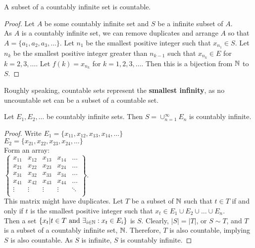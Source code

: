 \begin{theorem}
	A subset of a countably infinite set is countable.
	\begin{proof}
		Let $A$ be some countably infinite set and $S$ be a infinite subset of $A$.\\
		As $A$ is a countably infinite set, we can remove duplicates and arrange
		$A$ so that $A=\{a_1,a_2,a_3,\ldots\}$.
		Let $n_1$ be the smallest positive integer such that $x_{n_1} \in S$.
		Let $n_k$ be the smallest positive integer greater than $n_{k-1}$ such that $x_{n_{k}} \in E$ for $k=2,3,\ldots$. Let $f(k)=x_{n_k}$ for $k=1,2,3,\ldots$. Then this is a bijection from $\mathbb{N} $ to $S$.
	\end{proof}
	\begin{remark}
		Roughly speaking, countable sets represent the \textbf{smallest infinity}, as no uncountable set can be a subset of a countable set.
	\end{remark}


\end{theorem}
\begin{theorem}
	\label{thm:countableunion}
	Let $E_1, E_2, \ldots$ be countably infinite sets.
	Then $S=\cup_{n=1}^{\infty} E_n$ is countably infinite.
	\begin{proof}
		Write
		$E_1=\{x_{11},x_{12},x_{13},x_{14},\ldots\} $\\
		$E_2=\{x_{21},x_{22},x_{23},x_{24},\ldots\}$\\
		Form an array: \\
		$
			\begin{Bmatrix}
				x_{11} & x_{12} & x_{13} & x_{14} & \ldots \\
				x_{21} & x_{22} & x_{23} & x_{24} & \ldots \\
				x_{31} & x_{32} & x_{33} & x_{34} & \ldots \\
				x_{41} & x_{42} & x_{43} & x_{44} & \ldots \\
				\vdots & \vdots & \vdots & \vdots & \ddots \\
			\end{Bmatrix}
		$.\\
		This matrix might have duplicates.
		Let $T$ be a subset of $\mathbb{N}$ such that $t \in T$ if and only if
		$t$ is the smallest positive integer such that $x_{t} \in E_1 \cup E_2 \cup \ldots \cup E_n$.\\ Then a set $\{x_t|t \in T \text{ and } \exists_{i \in \mathbb{N} }: x_t \in E_{i}\}$ is $S$.
		Clearly, $|S|=|T|$, or $S\sim T$, and $T$ is a subset of a countably infinite set, $\mathbb{N} $.
		Therefore, $T$ is also countable, implying $S$ is also countable. As $S$ is infinite, $S$ is countably infinite.
	\end{proof}
\end{theorem}

